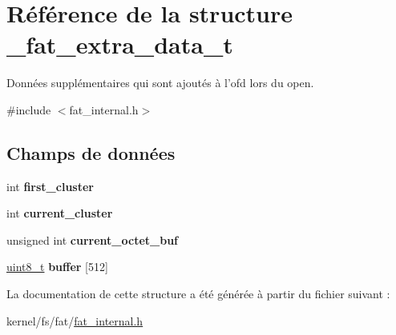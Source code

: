 \hypertarget{struct__fat__extra__data__t}{\section{Référence de la structure \-\_\-fat\-\_\-extra\-\_\-data\-\_\-t}
\label{struct__fat__extra__data__t}
}


Données supplémentaires qui sont ajoutés à l'ofd lors du open.  




{\ttfamily \#include $<$fat\-\_\-internal.\-h$>$}

\subsection*{Champs de données}
\begin{DoxyCompactItemize}
\item 
\hypertarget{struct__fat__extra__data__t_a5cc9910b0f971c600d2d4a52290509fa}{int {\bfseries first\-\_\-cluster}}\label{struct__fat__extra__data__t_a5cc9910b0f971c600d2d4a52290509fa}

\item 
\hypertarget{struct__fat__extra__data__t_a0708cae473b2962cfa6c10f50d9b008b}{int {\bfseries current\-\_\-cluster}}\label{struct__fat__extra__data__t_a0708cae473b2962cfa6c10f50d9b008b}

\item 
\hypertarget{struct__fat__extra__data__t_a38be57e802b36532ce01e46d7be7da44}{unsigned int {\bfseries current\-\_\-octet\-\_\-buf}}\label{struct__fat__extra__data__t_a38be57e802b36532ce01e46d7be7da44}

\item 
\hypertarget{struct__fat__extra__data__t_a74dd347d769bd4aefdf0ad1207be6798}{\hyperlink{kernel_2include_2types_8h_aba7bc1797add20fe3efdf37ced1182c5}{uint8\-\_\-t} {\bfseries buffer} \mbox{[}512\mbox{]}}\label{struct__fat__extra__data__t_a74dd347d769bd4aefdf0ad1207be6798}

\end{DoxyCompactItemize}


La documentation de cette structure a été générée à partir du fichier suivant \-:\begin{DoxyCompactItemize}
\item 
kernel/fs/fat/\hyperlink{fat__internal_8h}{fat\-\_\-internal.\-h}\end{DoxyCompactItemize}
